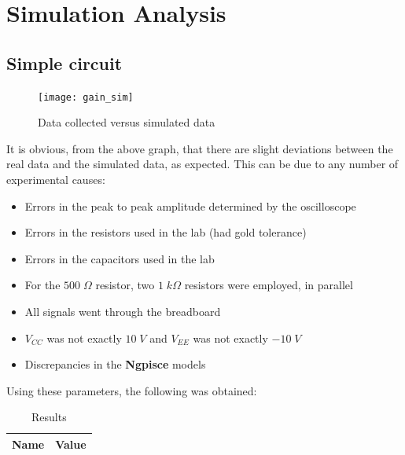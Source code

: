 \newpage

\section{Simulation Analysis}
\label{sec:simulation}

\subsection{Simple circuit}

\begin{figure}[H]
\centering
\texttt{[image: gain\_sim]}
\caption{Data collected versus simulated data}
\label{data_graph_sim}
\end{figure}

It is obvious, from the above graph, that there are slight deviations between the real data and the simulated data, as expected. This can be due to any number of experimental causes:

\begin{itemize}

\item Errors in the peak to peak amplitude determined by the oscilloscope

\item Errors in the resistors used in the lab (had gold tolerance)

\item Errors in the capacitors used in the lab

\item For the $500\;\Omega$ resistor, two $1\;k\Omega$ resistors were employed, in parallel

\item All signals went through the breadboard

\item $V_{CC}$ was not exactly $10\;V$ and $V_{EE}$ was not exactly $-10\;V$

\item Discrepancies in the {\bf Ngpisce} models

\end{itemize}

Using these parameters, the following was obtained:

\begin{table}[H]
  \centering
  \begin{tabular}{|c|c|}
    \hline
        {\bf Name} & {\bf Value} \\
        \hline
        \hline
        
        \hline
  \end{tabular}
  \caption{Results}
  \label{sim_results}
\end{table}

